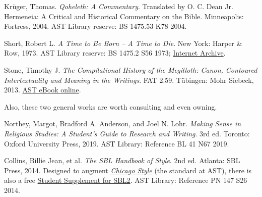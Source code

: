 \documentclass[titlepage]{article}
\begin{document}
\begin{thebibliography}{Christianson}
	 Krüger, Thomas.
	\emph{Qoheleth: A Commentary}. Translated by O. C. Dean Jr. Hermeneia: A Critical and Historical Commentary on the Bible.
	Minneapolis: Fortress, 2004. AST Library reserve: BS 1475.53 K78 2004.

	 Short, Robert L.
	\emph{A Time to Be Born -- A Time to Die}.
	New York: Harper \& Row, 1973. AST Library reserve: BS 1475.2 S56 1973; \href{https://archive.org/embed/timetobebornatim0000shor}{Internet Archive}.

	 Stone, Timothy J.
	\emph{The Compilational History of the Megilloth: Canon, Contoured Intertextuality and Meaning in the Writings}. FAT 2.59.
	Tübingen: Mohr Siebeck, 2013. \href{https://ast.primo.exlibrisgroup.com/view/action/uresolver.do?operation=resolveService&package_service_id=930405630007188&institutionId=7188&customerId=7185&VE=true}{AST eBook online}.

\end{thebibliography}
\endgroup

Also, these two general works are worth consulting and even owning.

\begingroup
\renewcommand{\section}[2]{}%
\begin{thebibliography}{RLGS}%

	 Northey, Margot, Bradford A. Anderson, and Joel N. Lohr.
	\emph{Making Sense in Religious Studies: A Student's Guide to Research and Writing}.
	3rd ed. Toronto: Oxford University Press, 2019. AST Library: Reference BL 41 N67 2019.

	 Collins, Billie Jean, et al.
	\emph{The SBL Handbook of Style}.
	2nd ed. Atlanta: SBL Press, 2014.
	Designed to augment \href{https://proxy.openathens.net/login?qurl=https%3A%2F%2Fwww.chicagomanualofstyle.org%2Fbook%2Fed17%2Ffrontmatter%2Ftoc.html}{\emph{Chicago Style}}
	(the standard at AST), there is also a free
	\href{https://www.sbl-site.org/assets/pdfs/pubs/SBLHSsupp2015-02.pdf}{Student Supplement for SBL2}. AST Library: Reference PN 147 S26 2014.

\end{thebibliography}
\endgroup
\end{document}
